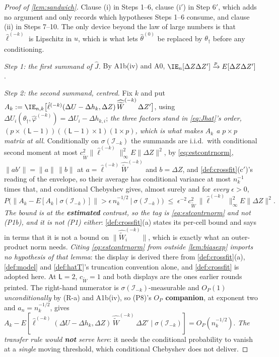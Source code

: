 \begin{proof}[Proof of \cref{lem:sandwich}]
Clause (i) in Steps 1--6, clause (i$'$) in Step 6$'$, which adds no argument and only records which
hypotheses Steps 1--6 consume, and clause (ii) in Steps 7--10. The only device beyond the law of large
numbers is that $\hat\ell^{(-k)}$ is Lipschitz in $u$, which is what lets $\hat\theta^{(0)}$ be replaced by
$\theta_\dagger$ before any conditioning.

\emph{Step 1: the first summand of $\hat J$.} By A1b(iv) and A0,
$\IE_n[\Delta Z\Delta Z']\xrightarrow{p}E[\Delta Z\Delta Z']$.

\emph{Step 2: the second summand, centred.} Fix $k$ and put
$A_k:=\IE_{n,k}\big[\hat\ell^{(-k)}(\Delta U-\Delta h_k,\Delta Z)\,\widehat{\widetilde W}^{(-k)}\,\Delta Z'\big]$,
using $\Delta U_i(\theta_\dagger,\hat\varphi^{(-k)})=\Delta U_i-\Delta h_{k,i}$; \emph{the three factors
stand in \eqref{eq:Jhat}'s order, $(p\times(\mathsf L-1))((\mathsf L-1)\times1)(1\times p)$, which is what
makes $A_k$ a $p\times p$ matrix at all}. Conditionally on
$\sigma(\mathcal I_{-k})$ the summands are i.i.d.\ with conditional second moment at most
$c_{\widetilde W}^{2}\|\hat\ell^{(-k)}\|^{2}_\infty E\|\Delta Z\|^{2}$, by \eqref{eq:estcontrnorm},
$\|ab'\|=\|a\|\,\|b\|$ at $a=\hat\ell^{(-k)}\widehat{\widetilde W}^{(-k)}$ and $b=\Delta Z$, and
\cref{def:crossfit}(c$'$)'s reading of the envelope, so their average has conditional variance at most
$n_k^{-1}$ times that, and conditional Chebyshev gives, almost surely and for \emph{every} $\epsilon>0$,
\[
P\Big(\big\|A_k-E[A_k\mid\sigma(\mathcal I_{-k})]\big\|>\epsilon\,n_k^{-1/2}\ \Big|\ \sigma(\mathcal I_{-k})\Big)
\;\le\;\epsilon^{-2}\,c_{\widetilde W}^{2}\,\big\|\hat\ell^{(-k)}\big\|^{2}_\infty E\|\Delta Z\|^{2} .
\]
\emph{The bound is at the \textbf{estimated} contrast, so the tag is \eqref{eq:estcontrnorm} and not
\textup{(P1b)}, and it is not \textup{(P1)} either}: \cref{def:crossfit}(a) states its per-cell bound and
says in terms that it is not a bound on $\|\widehat{\widetilde W}^{(-k)}_i\|$, which is exactly what an
outer-product norm needs. \emph{Citing \eqref{eq:estcontrnorm} from outside \cref{lem:biasexp} imports no
hypothesis of that lemma}: the display is derived there from \cref{def:crossfit}(a), \cref{def:model} and
\cref{def:hatT}'s truncation convention alone, and \cref{def:crossfit} is adopted here. At
$\mathsf L=2$, $c_{\widetilde W}=1$ and both displays are the ones earlier rounds printed.
The right-hand numerator is $\sigma(\mathcal I_{-k})$-measurable and $O_P(1)$ \emph{unconditionally} by
(R-a) and A1b(iv), so \textup{(P8)}'s \textbf{$O_P$ companion}, at exponent two and $a_n=n_k^{-1/2}$,
gives
$A_k-E[\hat\ell^{(-k)}(\Delta U-\Delta h_k,\Delta Z)\,\widehat{\widetilde W}^{(-k)}\,\Delta Z'\mid\sigma(\mathcal I_{-k})]=O_P(n_k^{-1/2})$.
\emph{The transfer rule would \textbf{not} serve here}: it needs the conditional probability to vanish at
a \emph{single} moving threshold, which conditional Chebyshev does not deliver.


\end{proof}
